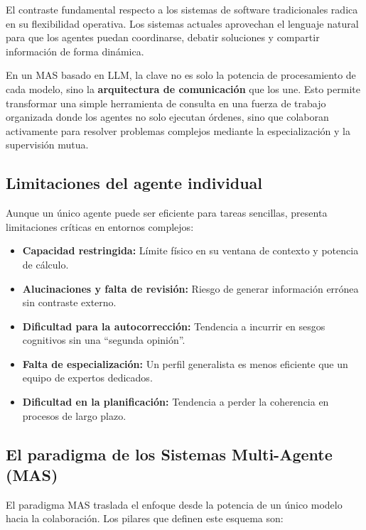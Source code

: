 \documentclass[12pt,a4paper]{article}
\begin{document}
El contraste fundamental respecto a los sistemas de software tradicionales radica en su flexibilidad operativa. Los sistemas actuales aprovechan el lenguaje natural para que los agentes puedan coordinarse, debatir soluciones y compartir información de forma dinámica.

En un MAS basado en LLM, la clave no es solo la potencia de procesamiento de cada modelo, sino la \textbf{arquitectura de comunicación} que los une. Esto permite transformar una simple herramienta de consulta en una fuerza de trabajo organizada donde los agentes no solo ejecutan órdenes, sino que colaboran activamente para resolver problemas complejos mediante la especialización y la supervisión mutua.

\subsection{Limitaciones del agente individual}

Aunque un único agente puede ser eficiente para tareas sencillas, presenta limitaciones críticas en entornos complejos:

\begin{itemize}
    \item \textbf{Capacidad restringida:} Límite físico en su ventana de contexto y potencia de cálculo.
    \item \textbf{Alucinaciones y falta de revisión:} Riesgo de generar información errónea sin contraste externo.
    \item \textbf{Dificultad para la autocorrección:} Tendencia a incurrir en sesgos cognitivos sin una ``segunda opinión''.
    \item \textbf{Falta de especialización:} Un perfil generalista es menos eficiente que un equipo de expertos dedicados.
    \item \textbf{Dificultad en la planificación:} Tendencia a perder la coherencia en procesos de largo plazo.
\end{itemize}

\subsection{El paradigma de los Sistemas Multi-Agente (MAS)}

El paradigma MAS traslada el enfoque desde la potencia de un único modelo hacia la colaboración. Los pilares que definen este esquema son:
\end{document}
